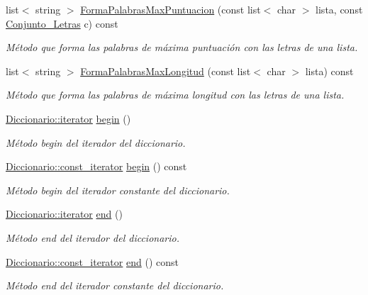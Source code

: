 \begin{DoxyCompactItemize}
list$<$ string $>$ \hyperlink{classDiccionario_adfe4d8e5ba24ffae01075505a0ae5e27}{Forma\+Palabras\+Max\+Puntuacion} (const list$<$ char $>$ lista, const \hyperlink{classConjunto__Letras}{Conjunto\+\_\+\+Letras} c) const
\begin{DoxyCompactList}\small\item\em Método que forma las palabras de máxima puntuación con las letras de una lista. \end{DoxyCompactList}\item 
list$<$ string $>$ \hyperlink{classDiccionario_ac3ac6036aed4a89b7b8955be2750d1c4}{Forma\+Palabras\+Max\+Longitud} (const list$<$ char $>$ lista) const
\begin{DoxyCompactList}\small\item\em Método que forma las palabras de máxima longitud con las letras de una lista. \end{DoxyCompactList}\item 
\hyperlink{classDiccionario_a51a063699a325e85d6c2640e9c4b42cf}{Diccionario\+::iterator} \hyperlink{classDiccionario_ab270eb969d580f01b358e648a3061ac4}{begin} ()
\begin{DoxyCompactList}\small\item\em Método begin del iterador del diccionario. \end{DoxyCompactList}\item 
\hyperlink{classDiccionario_acc32ba2eaee59fdd4836d9a28f04afd0}{Diccionario\+::const\+\_\+iterator} \hyperlink{classDiccionario_a5196245f1d267b0ddb9350dfa8f33b2c}{begin} () const
\begin{DoxyCompactList}\small\item\em Método begin del iterador constante del diccionario. \end{DoxyCompactList}\item 
\hyperlink{classDiccionario_a51a063699a325e85d6c2640e9c4b42cf}{Diccionario\+::iterator} \hyperlink{classDiccionario_a7de585de002dfdec241b645bc57a3d0a}{end} ()
\begin{DoxyCompactList}\small\item\em Método end del iterador del diccionario. \end{DoxyCompactList}\item 
\hyperlink{classDiccionario_acc32ba2eaee59fdd4836d9a28f04afd0}{Diccionario\+::const\+\_\+iterator} \hyperlink{classDiccionario_a8161ae4e92a33e516bf73741e8299846}{end} () const
\begin{DoxyCompactList}\small\item\em Método end del iterador constante del diccionario. \end{DoxyCompactList}\end{DoxyCompactItemize}
